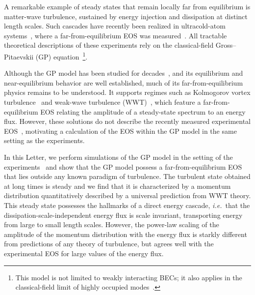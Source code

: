 \documentclass[prl,aps,twocolumn, a4paper,longbibliography,superscriptaddress]{revtex4-2}
\begin{document}
A remarkable example of steady states that remain locally far from equilibrium is matter-wave turbulence, sustained by energy injection and dissipation at distinct length scales.
Such cascades have recently been realized in ultracold-atom systems~\cite{Navon:2016,Navon:2019,Zhao:2025}, where a far-from-equilibrium EOS was measured~\cite{Dogra:2023}.
All tractable theoretical descriptions of these experiments rely on the classical-field Gross–Pitaevskii (GP) equation~\cite{Chantesana:2019,Sano:2022,Zhu:2023a,Fischer:2024}\footnote{This model is not limited to weakly interacting BECs; it also applies in the classical-field limit of highly occupied modes~\cite{Sinatra:2001,Davis:2002}.}.



Although the GP model has been studied for decades~\cite{fibich2015nonlinear,Pitaevskii:2016}, and its equilibrium and near-equilibrium behavior are well established, much of its far-from-equilibrium physics remains to be understood.
It supports regimes such as Kolmogorov vortex turbulence~ \cite{Nore:1997,Kobayashi:2005,Tsubota:2017,kobayashi2021quantum,Tanogami:2021,Zhao:2025} and weak-wave turbulence (WWT)~\cite{Zakharov:1992,Nazarenko:2011}, which feature a far-from-equilibrium EOS relating the amplitude of a steady-state spectrum to an energy flux.
However, these solutions do not describe the recently measured experimental EOS~\cite{Dogra:2023}, motivating a calculation of the EOS within the GP model in the same setting as the experiments.


In this Letter, we perform simulations of the GP model in the setting of the experiments~\cite{Dogra:2023} and show that the GP model possess a far-from-equilibrium EOS that lies outside any known paradigm of turbulence. The turbulent state obtained at long times is steady and we find that it is characterized by a momentum distribution quantitatively described by a universal prediction from WWT theory. This steady state possesses the hallmarks of a direct energy cascade, \emph{i.e.}\ that the dissipation-scale-independent energy flux is scale invariant, transporting energy from large to small length scales.
However, the power-law scaling of the amplitude of the momentum distribution with the energy flux is starkly different from predictions of any theory of turbulence, but agrees well with the experimental EOS for large values of the energy flux.
\end{document}
